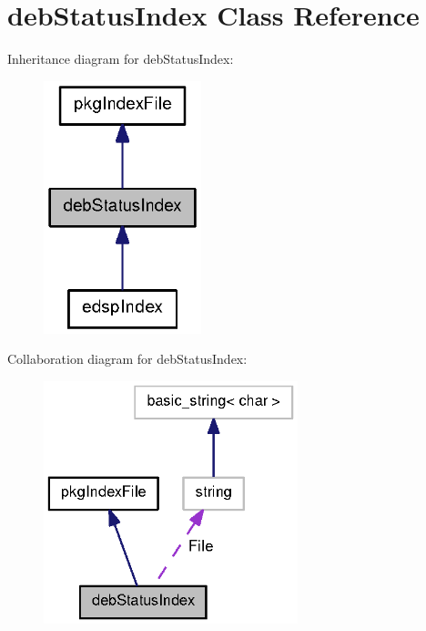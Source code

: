 \section{deb\-Status\-Index \-Class \-Reference}
\label{classdebStatusIndex}


\-Inheritance diagram for deb\-Status\-Index\-:
\nopagebreak
\begin{figure}[H]
\begin{center}
\leavevmode
\includegraphics[width=130pt]{classdebStatusIndex__inherit__graph}
\end{center}
\end{figure}


\-Collaboration diagram for deb\-Status\-Index\-:
\nopagebreak
\begin{figure}[H]
\begin{center}
\leavevmode
\includegraphics[width=209pt]{classdebStatusIndex__coll__graph}
\end{center}
\end{figure}
